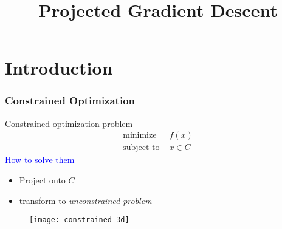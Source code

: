 \documentclass{beamer}
\title{Projected Gradient Descent}
\begin{document}
\maketitle
\frame{\tableofcontents}

\section{Introduction}%



\begin{frame}
  \frametitle{Constrained Optimization}

  \begin{minipage}{0.5\textwidth}
    \begin{block}{Constrained optimization problem}
      \begin{equation}
        \begin{aligned}
          \text{minimize } & f(x)\\
          \text{subject to } & x\in C
        \end{aligned}
      \end{equation}
      \textcolor{blue}{How to solve them}
      \begin{itemize}
        \item Project onto $C$
        \item transform to \textit{unconstrained problem}
      \end{itemize}
    \end{block}
  \end{minipage}
  \begin{minipage}{0.45\textwidth}
    \begin{figure}[ht]
      \centering
      \texttt{[image: constrained\_3d]}
    \end{figure}
  \end{minipage}
\end{frame}
\end{document}
